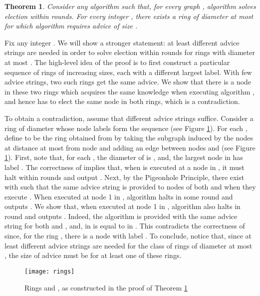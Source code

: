 \documentclass[11pt]{article}
\newtheorem{theorem}{Theorem}[section]
\newcommand{\qed}{\hfill  \bigbreak}
\newenvironment{proof}{\noindent {\bf Proof.}}{\qed}
\begin{document}
\begin{theorem}\label{diam}
Consider any algorithm  such that, for every graph , algorithm  solves election within  rounds. For every integer , there exists a ring of diameter at most  for which algorithm  requires advice of size .
\end{theorem}
\begin{proof}
Fix any integer . We will show a stronger statement: at least  different advice strings are needed in order to solve election within  rounds for 
rings  with diameter at most . The high-level idea of the proof is to first construct a particular sequence of  rings of increasing sizes, each with a different largest label.
With few advice strings, two such rings get the same advice. We show that there is a node in these two rings which acquires the same knowledge when executing algorithm , and hence has to elect the same node in both rings, which is a contradiction. 

To obtain a contradiction, assume that  different advice strings suffice. Consider a ring  of diameter  whose node labels form the sequence  (see Figure \ref{rings}). For each , define  to be the ring obtained from  by taking the subgraph induced by the nodes at distance at most  from node  and adding an edge between nodes  and  (see Figure \ref{rings}). First, note that, for each , the diameter of  is , and, the largest node in  has label . The correctness of  implies that, when  is executed at a node in , it must halt within  rounds and output . Next, by the Pigeonhole Principle, there exist  with  such that the same advice string is provided to nodes of both  and  when they execute . When executed at node 1 in , algorithm  halts in some round  and outputs . We show that, when executed at node 1 in , algorithm  also halts in round  and outputs . Indeed, the algorithm is provided with the same advice string for both  and , and,  in  is equal to   in . This contradicts the correctness of  since, for the ring , there is a node with label . To conclude, notice that, 
since at least  different advice strings are needed for the class of rings of diameter at most , the size of advice must be  for at least one
of these rings. 
\end{proof}

\begin{figure}[!ht]
\begin{center}
\texttt{[image: rings]}
\end{center}
\caption{Rings  and , as constructed in the proof of Theorem \ref{diam}}
\label{rings}
\end{figure}
\end{document}
